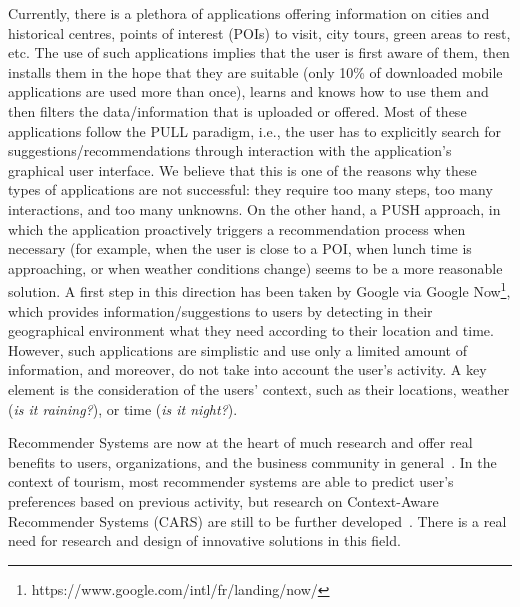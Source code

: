 
Currently, there is a plethora of applications offering information on cities and historical centres, points of interest (POIs) to visit, city tours, green areas to rest, etc. The use of such applications implies that the user is first aware of them, then installs them in the hope that they are suitable (only 10\% of downloaded mobile applications are used more than once), learns and knows how
to use them and then filters the data/information that is uploaded or offered. Most of these
applications follow the PULL paradigm, i.e., the user has to explicitly search for
suggestions/recommendations through interaction with the application’s graphical user interface.
We believe that this is one of the reasons why these types of applications are not successful: they
require too many steps, too many interactions, and too many unknowns. On the other hand, a
PUSH approach, in which the application proactively triggers a recommendation process when
necessary (for example, when the user is close to a POI, when lunch time is approaching, or
when weather conditions change) seems to be a more reasonable solution. A first step in this
direction has been taken by Google via Google Now\footnote{https://www.google.com/intl/fr/landing/now/}, 
which provides information/suggestions
to users by detecting in their geographical environment what they need according to their
location and time. However, such applications are simplistic and use only a limited amount of
information, and moreover, do not take into account the user’s activity. A key element is the
consideration of the users' context, such as their locations, weather (\textit{is it raining?}), or time (\textit{is it night?}).

Recommender Systems are now at the heart of
much research and offer real benefits to users, organizations, and the business community in
general~\cite{borras2014intelligent,del2016pull,leskovec2020mining}. In the context of tourism, most recommender systems are able to predict user's preferences based on previous activity, but research on Context-Aware Recommender Systems
(CARS) are still to
be further developed~\cite{adomavicius2011context,nejma2015service,haruna2017context,raza2019progress}. There is a real need for research and design of innovative solutions in this field.



